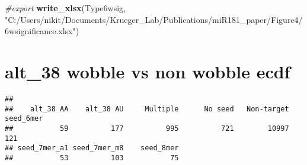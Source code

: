 \documentclass[
]{article}
\newenvironment{Shaded}{\begin{snugshade}}{\end{snugshade}}
\newcommand{\CommentTok}[1]{\textcolor[rgb]{0.56,0.35,0.01}{\textit{#1}}}
\newcommand{\FunctionTok}[1]{\textcolor[rgb]{0.13,0.29,0.53}{\textbf{#1}}}
\newcommand{\NormalTok}[1]{#1}
\newcommand{\OtherTok}[1]{\textcolor[rgb]{0.56,0.35,0.01}{#1}}
\newcommand{\SpecialCharTok}[1]{\textcolor[rgb]{0.81,0.36,0.00}{\textbf{#1}}}
\newcommand{\StringTok}[1]{\textcolor[rgb]{0.31,0.60,0.02}{#1}}
\begin{document}
\begin{Shaded}
\begin{Highlighting}[]
\CommentTok{\#export}
\FunctionTok{write\_xlsx}\NormalTok{(Type6wsig, }\StringTok{"C:/Users/nikit/Documents/Krueger\_Lab/Publications/miR181\_paper/Figure4/6wsignificance.xlsx"}\NormalTok{)}
\end{Highlighting}
\end{Shaded}

\hypertarget{alt_38-wobble-vs-non-wobble-ecdf}{%
\section{alt\_38 wobble vs non wobble
ecdf}\label{alt_38-wobble-vs-non-wobble-ecdf}}

\begin{Shaded}
\end{Shaded}

\begin{verbatim}
## 
##    alt_38 AA    alt_38 AU     Multiple      No seed   Non-target    seed_6mer 
##           59          177          995          721        10997          121 
## seed_7mer_a1 seed_7mer_m8    seed_8mer 
##           53          103           75
\end{verbatim}
\end{document}
